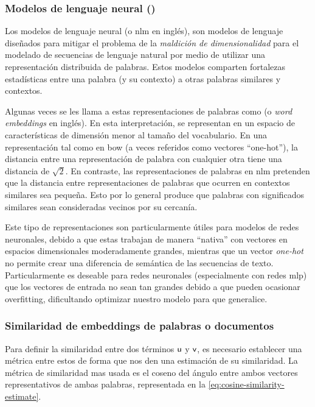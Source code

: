 \subsubsection{Modelos de lenguaje neural ()}
Los modelos de lenguaje neural (o \gls{nlm} en inglés), son modelos de lenguaje diseñados para mitigar el problema de la \textit{maldición de dimensionalidad} para el modelado de secuencias de lenguaje natural por medio de utilizar una representación distribuida de palabras. Estos modelos comparten fortalezas estadísticas entre una palabra (y su contexto) a otras palabras similares y contextos.

Algunas veces se les llama a estas representaciones de palabras como  (o \textsl{word embeddings} en inglés). En esta interpretación, se representan en un espacio de características de dimensión menor al tamaño del vocabulario. En una representación tal como en \gls{bow} (a veces referidos como vectores ``one-hot''), la distancia entre una representación de palabra con cualquier otra tiene una distancia de $\sqrt{2}$. En contraste, las representaciones de palabras en \gls{nlm} pretenden que la distancia entre representaciones de palabras que ocurren en contextos similares sea pequeña. Esto por lo general produce que palabras con significados similares sean consideradas vecinos por su cercanía.

Este tipo de representaciones son particularmente útiles para modelos de redes neuronales, debido a que estas trabajan de manera ``nativa'' con vectores en espacios dimensionales moderadamente grandes, mientras que un vector \emph{one-hot} no permite crear una diferencia de semántica de las secuencias de texto. Particularmente es deseable para redes neuronales (especialmente con redes \gls{mlp}) que los vectores de entrada no sean tan grandes debido a que pueden ocasionar \gls{overfitting}, dificultando optimizar nuestro modelo para que generalice.

\subsubsection{Similaridad de embeddings de palabras o documentos}
Para definir la similaridad entre dos términos ${\mathit{\mathsf{u}}}$ y ${\mathit{\mathsf{v}}}$, es necesario establecer una métrica entre estos de forma que nos den una estimación de su similaridad. La métrica de similaridad mas usada es el coseno del ángulo entre ambos vectores representativos de ambas palabras, representada en la \cref{eq:cosine-similarity-estimate}.

